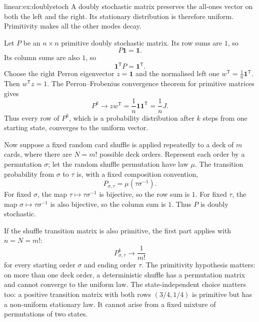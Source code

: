 \begin{solution}{linear:ex:doublystoch}
\idea A doubly stochastic matrix preserves the all-ones vector on both the left and the right. Its stationary distribution is therefore uniform. Primitivity makes all the other modes decay.

\writeup Let $P$ be an $n\times n$ primitive doubly stochastic matrix. Its row sums are $1$, so
\[
P\mathbf1=\mathbf1.
\]
Its column sums are also $1$, so
\[
\mathbf1^{\mathsf T}P=\mathbf1^{\mathsf T}.
\]
Choose the right Perron eigenvector $z=\mathbf1$ and the normalised left one $w^{\mathsf T}=\frac1n\mathbf1^{\mathsf T}$. Then $w^{\mathsf T}z=1$. The Perron--Frobenius convergence theorem for primitive matrices gives
\[
P^k\longrightarrow zw^{\mathsf T}
=\frac1n\mathbf1\mathbf1^{\mathsf T}
=\boxed{\frac1nJ}.
\]
Thus every row of $P^k$, which is a probability distribution after $k$ steps from one starting state, converges to the uniform vector.

Now suppose a fixed random card shuffle is applied repeatedly to a deck of $m$ cards, where there are $N=m!$ possible deck orders. Represent each order by a permutation $\sigma$; let the random shuffle permutation have law $\mu$. The transition probability from $\sigma$ to $\tau$ is, with a fixed composition convention,
\[
P_{\sigma,\tau}=\mu(\tau\sigma^{-1}).
\]
For fixed $\sigma$, the map $\tau\mapsto\tau\sigma^{-1}$ is bijective, so the row sum is $1$. For fixed $\tau$, the map $\sigma\mapsto\tau\sigma^{-1}$ is also bijective, so the column sum is $1$. Thus $P$ is doubly stochastic.

If the shuffle transition matrix is also primitive, the first part applies with $n=N=m!$:
\[
\boxed{P^k_{\sigma,\tau}\longrightarrow\frac1{m!}}
\]
for every starting order $\sigma$ and ending order $\tau$.
The primitivity hypothesis matters: on more than one deck order, a
deterministic shuffle has a permutation matrix and cannot converge to the
uniform law. The state-independent choice matters too: a positive transition
matrix with both rows $(3/4,1/4)$ is primitive but has a non-uniform stationary
law. It cannot arise from a fixed mixture of permutations of two states.
\end{solution}

